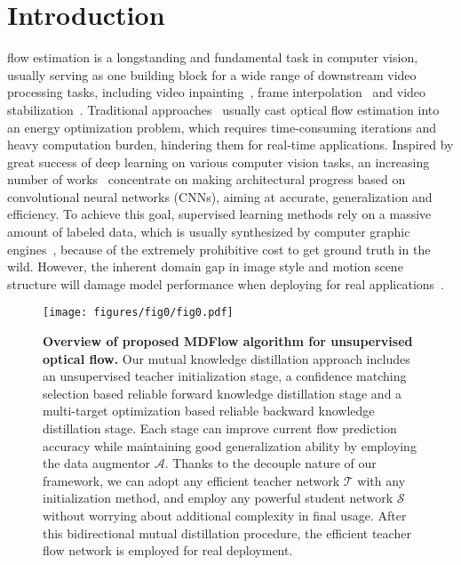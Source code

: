 \documentclass[lettersize,journal]{IEEEtran}
\begin{document}
\section{Introduction}
 flow estimation is a longstanding and fundamental task in computer vision, usually serving as one building block for a wide range of downstream video processing tasks, including video inpainting~\cite{9241798}, frame interpolation~\cite{Kong_2022_CVPR,Liu_2022_ICIP} and video stabilization~\cite{7508986}. Traditional approaches~\cite{10.5555/888857,5206697,5539939,8434339} usually cast optical flow estimation into an energy optimization problem, which requires time-consuming iterations and heavy computation burden, hindering them for real-time applications. Inspired by great success of deep learning on various computer vision tasks, an increasing number of works~\cite{7410673,8099662,8579029,Hur:2019:IRR,teed2020raft,NEURIPS2020_add5aebf} concentrate on making architectural progress based on convolutional neural networks (CNNs), aiming at accurate, generalization and efficiency. To achieve this goal, supervised learning methods rely on a massive amount of labeled data, which is usually synthesized by computer graphic engines~\cite{7410673,7780807,humanflow}, because of the extremely prohibitive cost to get ground truth in the wild. However, the inherent domain gap in image style and motion scene structure will damage model performance when deploying for real applications~\cite{flowdata}.

\begin{figure}[t]
	\centering
	\vspace{2mm}
	\texttt{[image: figures/fig0/fig0.pdf]}
	\vspace{-1mm}
	\caption{\textbf{Overview of proposed MDFlow algorithm for unsupervised optical flow.} Our mutual knowledge distillation approach includes an unsupervised teacher initialization stage, a confidence matching selection based reliable forward knowledge distillation stage and a multi-target optimization based reliable backward knowledge distillation stage. Each stage can improve current flow prediction accuracy while maintaining good generalization ability by employing the data augmentor $\mathcal{A}$. Thanks to the decouple nature of our framework, we can adopt any efficient teacher network $\mathcal{T}$ with any initialization method, and employ any powerful student network $\mathcal{S}$ without worrying about additional complexity in final usage. After this bidirectional mutual distillation procedure, the efficient teacher flow network is employed for real deployment.}
	\label{fig:0}
	\vspace{-1mm}
\end{figure}
\end{document}
